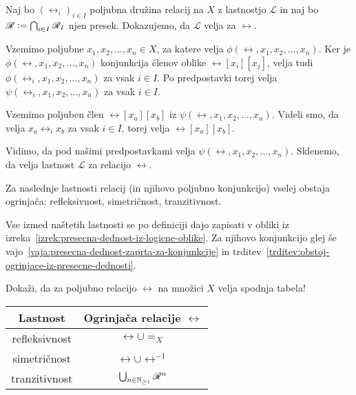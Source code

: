                 \begin{dokaz}
                        Naj bo $(\rel_i)_{i \in I}$ poljubna družina relacij na $X$ z lastnostjo $\mathscr{L}$ in naj bo $\rel \dfeq \bigcap_{i \in I} \rel_I$ njen presek. Dokazujemo, da $\mathscr{L}$ velja za $\rel$.

                        Vzemimo poljubne $x_1, x_2, \ldots, x_n \in X$, za katere velja $\phi(\rel, x_1, x_2, \ldots, x_n)$. Ker je $\phi(\rel, x_1, x_2, \ldots, x_n)$ konjunkcija členov oblike $\rel[x_i][x_j]$, velja tudi $\phi(\rel_i, x_1, x_2, \ldots, x_n)$ za vsak $i \in I$. Po predpostavki torej velja $\psi(\rel_i, x_1, x_2, \ldots, x_n)$ za vsak $i \in I$.

                        Vzemimo poljuben člen $\rel[x_a][x_b]$ iz $\psi(\rel, x_1, x_2, \ldots, x_n)$. Videli smo, da velja $x_a \mathrel{\rel_i} x_b$ za vsak $i \in I$, torej velja $\rel[x_a][x_b]$.

                        Vidimo, da pod našimi predpostavkami velja $\psi(\rel, x_1, x_2, \ldots, x_n)$. Sklenemo, da velja lastnost $\mathscr{L}$ za relacijo $\rel$.
                \end{dokaz}

                \begin{posledica}\label{posledica:obstoj-ogrinjac}
                        Za naslednje lastnosti relacij (in njihovo poljubno konjunkcijo) vselej obstaja ogrinjača: refleksivnost, simetričnost, tranzitivnost.
                \end{posledica}

                \begin{dokaz}
                        Vse izmed naštetih lastnosti se po definiciji dajo zapisati v obliki iz izreka~\ref{izrek:presecna-dednost-iz-logicne-oblike}. Za njihovo konjunkcijo glej še vajo~\ref{vaja:presecna-dednost-zaprta-za-konjunkcije} in trditev~\ref{trditev:obstoj-ogrinjace-iz-presecne-dednosti}.
                \end{dokaz}

                \begin{vaja}
                        Dokaži, da za poljubno relacijo $\rel$ na množici $X$ velja spodnja tabela!
                        \begin{center}
                                \begin{tabular}{|c|c|}
                                        \hline
                                        \textbf{Lastnost} & \textbf{Ogrinjača relacije $\rel$} \\
                                        \hline
                                        refleksivnost & $\rel \cup =_X$ \\
                                        simetričnost & $\rel \cup \rel^{-1}$ \\
                                        tranzitivnost & $\bigcup_{n \in \NN_{\geq 1}} \rel^n$ \\
                                        \hline
                                \end{tabular}
                        \end{center}
                \end{vaja}

